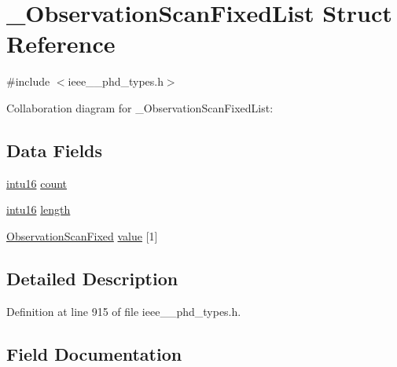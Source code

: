 \hypertarget{struct___observation_scan_fixed_list}{}\section{\+\_\+\+Observation\+Scan\+Fixed\+List Struct Reference}
\label{struct___observation_scan_fixed_list}


{\ttfamily \#include $<$ieee\+\_\+\_\+phd\+\_\+types.\+h$>$}



Collaboration diagram for \+\_\+\+Observation\+Scan\+Fixed\+List\+:
\subsection*{Data Fields}
\begin{DoxyCompactItemize}
\item 
\hyperlink{ieee__11073__phd__types_8h_a3561595d2aa7416532e1c9910abd076d}{intu16} \hyperlink{struct___observation_scan_fixed_list_abf6db060ae8e224764b0f867fb135ecd}{count}
\item 
\hyperlink{ieee__11073__phd__types_8h_a3561595d2aa7416532e1c9910abd076d}{intu16} \hyperlink{struct___observation_scan_fixed_list_a3743679e4ff85e3e1b3fc2e59973fbb3}{length}
\item 
\hyperlink{ieee__11073__phd__types_8h_ae3e6b107ff2e22ea313be44b713d41dd}{Observation\+Scan\+Fixed} \hyperlink{struct___observation_scan_fixed_list_a3d8d9735ae9b467e18886ad0ef60cd6f}{value} \mbox{[}1\mbox{]}
\end{DoxyCompactItemize}


\subsection{Detailed Description}


Definition at line 915 of file ieee\+\_\+\_\+phd\+\_\+types.\+h.



\subsection{Field Documentation}
\hypertarget{struct___observation_scan_fixed_list_abf6db060ae8e224764b0f867fb135ecd}{}
